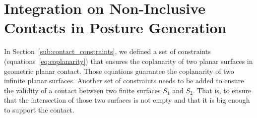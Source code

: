 \section{Integration on Non-Inclusive Contacts in Posture Generation}


In Section~\ref{sub:contact_constraints}, we defined a set of constraints (equations~\ref{eq:coplanarity}) that ensures the coplanarity of two planar surfaces in geometric planar contact.
Those equations guarantee the coplanarity of two infinite planar surfaces.
Another set of constraints needs to be added to ensure the validity of a contact between two finite surfaces $S_1$ and $S_2$.
That is, to ensure that the intersection of those two surfaces is not empty and that it is big enough to support the contact.

